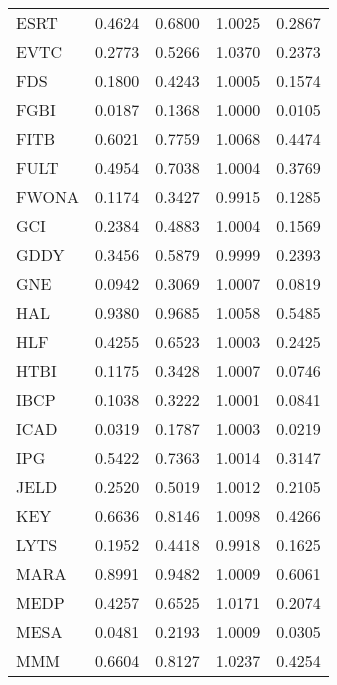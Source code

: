 \begin{table}
\begin{tabular}{lrrrr}
ESRT & 0.4624 & 0.6800 & 1.0025 & 0.2867 \\
EVTC & 0.2773 & 0.5266 & 1.0370 & 0.2373 \\
FDS & 0.1800 & 0.4243 & 1.0005 & 0.1574 \\
FGBI & 0.0187 & 0.1368 & 1.0000 & 0.0105 \\
FITB & 0.6021 & 0.7759 & 1.0068 & 0.4474 \\
FULT & 0.4954 & 0.7038 & 1.0004 & 0.3769 \\
FWONA & 0.1174 & 0.3427 & 0.9915 & 0.1285 \\
GCI & 0.2384 & 0.4883 & 1.0004 & 0.1569 \\
GDDY & 0.3456 & 0.5879 & 0.9999 & 0.2393 \\
GNE & 0.0942 & 0.3069 & 1.0007 & 0.0819 \\
HAL & 0.9380 & 0.9685 & 1.0058 & 0.5485 \\
HLF & 0.4255 & 0.6523 & 1.0003 & 0.2425 \\
HTBI & 0.1175 & 0.3428 & 1.0007 & 0.0746 \\
IBCP & 0.1038 & 0.3222 & 1.0001 & 0.0841 \\
ICAD & 0.0319 & 0.1787 & 1.0003 & 0.0219 \\
IPG & 0.5422 & 0.7363 & 1.0014 & 0.3147 \\
JELD & 0.2520 & 0.5019 & 1.0012 & 0.2105 \\
KEY & 0.6636 & 0.8146 & 1.0098 & 0.4266 \\
LYTS & 0.1952 & 0.4418 & 0.9918 & 0.1625 \\
MARA & 0.8991 & 0.9482 & 1.0009 & 0.6061 \\
MEDP & 0.4257 & 0.6525 & 1.0171 & 0.2074 \\
MESA & 0.0481 & 0.2193 & 1.0009 & 0.0305 \\
MMM & 0.6604 & 0.8127 & 1.0237 & 0.4254 \\
\bottomrule
\end{tabular}
\end{table}
